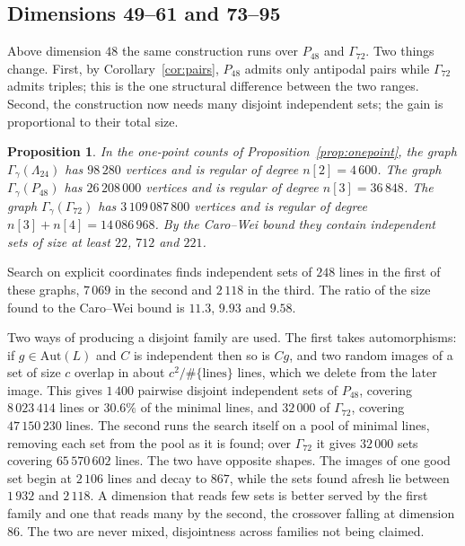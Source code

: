 \documentclass[11pt]{amsart}
\newtheorem{proposition}[theorem]{Proposition}
\theoremstyle{remark}
\newcommand{\Leech}{\Lambda_{24}}
\newcommand{\Pff}{P_{48}}
\newcommand{\Gsz}{\Gamma_{72}}
\begin{document}
\subsection{Dimensions 49--61 and 73--95}\label{ss:big}

Above dimension $48$ the same construction runs over $\Pff$ and $\Gsz$. Two
things change. First, by Corollary~\ref{cor:pairs}, $\Pff$ admits only antipodal
pairs while $\Gsz$ admits triples; this is the one structural difference between
the two ranges. Second, the construction now needs many disjoint independent
sets; the gain is proportional to their total size.

\begin{proposition}\label{prop:classes}
In the one-point counts of Proposition~\ref{prop:onepoint}, the graph
$\Gamma_\gamma(\Leech)$ has $98\,280$ vertices and is regular of degree
$n[2]=4\,600$. The graph $\Gamma_\gamma(\Pff)$ has $26\,208\,000$ vertices and is
regular of degree $n[3]=36\,848$. The graph $\Gamma_\gamma(\Gsz)$ has
$3\,109\,087\,800$ vertices and is regular of degree $n[3]+n[4]=14\,086\,968$. By
the Caro--Wei bound they contain independent sets of size at least $22$, $712$
and $221$.
\end{proposition}

Search on explicit coordinates finds independent sets of $248$ lines in the
first of these graphs, $7\,069$ in the second and $2\,118$ in the third. The
ratio of the size found to the Caro--Wei bound is $11.3$, $9.93$ and $9.58$.

Two ways of producing a disjoint family are used. The first takes automorphisms:
if $g\in\mathrm{Aut}(L)$ and $C$ is independent then so is $Cg$, and two random
images of a set of size $c$ overlap in about $c^2/\#\{\text{lines}\}$ lines,
which we delete from the later image. This gives $1\,400$ pairwise disjoint
independent sets of $\Pff$, covering $8\,023\,414$ lines or $30.6\%$ of the
minimal lines, and $32\,000$ of $\Gsz$, covering $47\,150\,230$ lines. The second
runs the search itself on a pool of minimal lines, removing each set from the
pool as it is found; over $\Gsz$ it gives $32\,000$ sets covering
$65\,570\,602$ lines. The two have opposite shapes. The images of one good set
begin at $2\,106$ lines and decay to $867$, while the sets found afresh lie
between $1\,932$ and $2\,118$. A dimension that reads few sets is better served
by the first family and one that reads many by the second, the crossover falling
at dimension $86$. The two are never mixed, disjointness across families not
being claimed.
\end{document}
